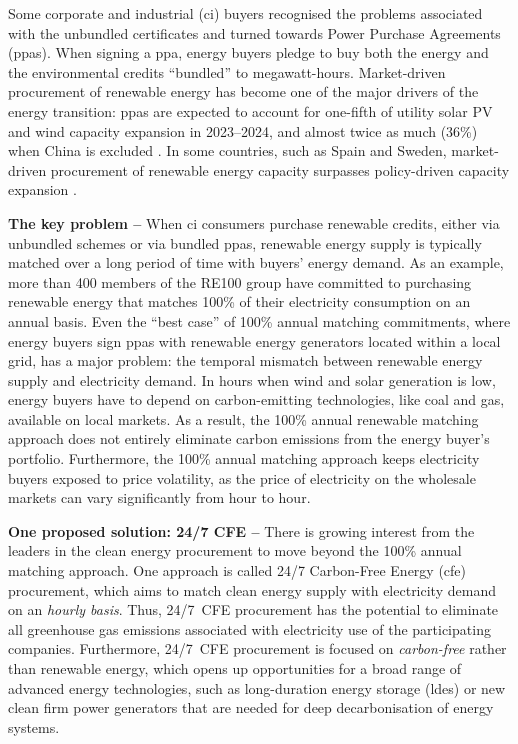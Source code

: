 \documentclass[11pt, 5p, nopreprintline]{elsarticle}
\begin{document}
Some corporate and industrial (\gls{ci}) buyers recognised the problems associated with the unbundled certificates and turned towards Power Purchase Agreements (\gls{ppa}s).
When signing a \gls{ppa}, energy buyers pledge to buy both the energy and the environmental credits \enquote{bundled} to megawatt-hours.
Market-driven procurement of renewable energy has become one of the major drivers of the energy transition: \gls{ppa}s are expected to account for one-fifth of utility solar PV and wind capacity expansion in 2023--2024, and almost twice as much (36\%) when China is excluded \cite{iea-REppa2023}.
In some countries, such as Spain and Sweden, market-driven procurement of renewable energy capacity surpasses policy-driven capacity expansion \cite{iea-REppa2023}.

\textbf{The key problem --} When \gls{ci} consumers purchase renewable credits, either via unbundled schemes or via bundled \gls{ppa}s, renewable energy supply is typically matched over a long period of time with buyers' energy demand.
As an example, more than 400 members of the RE100 group \cite{re100report-2020} have committed to purchasing renewable energy that matches 100\% of their electricity consumption on an annual basis.
Even the \enquote{best case} of 100\% annual matching commitments, where energy buyers sign \gls{ppa}s with renewable energy generators located within a local grid, has a major problem: the temporal mismatch between renewable energy supply and electricity demand.
In hours when wind and solar generation is low, energy buyers have to depend on carbon-emitting technologies, like coal and gas, available on local markets.
As a result, the 100\% annual renewable matching approach does not entirely eliminate carbon emissions from the energy buyer's portfolio.
Furthermore, the 100\% annual matching approach keeps electricity buyers exposed to price volatility, as the price of electricity on the wholesale markets can vary significantly from hour to hour.


\textbf{One proposed solution: 24/7 CFE --} There is growing interest from the leaders in the clean energy procurement to move beyond the 100\% annual matching approach.
One approach is called 24/7 Carbon-Free Energy (\gls{cfe}) procurement, which aims to match clean energy supply with electricity demand on an \textit{hourly basis}.
Thus, 24/7~CFE procurement has the potential to eliminate all greenhouse gas emissions associated with electricity use of the participating companies.
Furthermore, 24/7~CFE procurement is focused on \textit{carbon-free} rather than renewable energy, which opens up opportunities for a broad range of advanced energy technologies, such as long-duration energy storage (\gls{ldes}) or new clean firm power generators that are needed for deep decarbonisation of energy systems.
\end{document}
